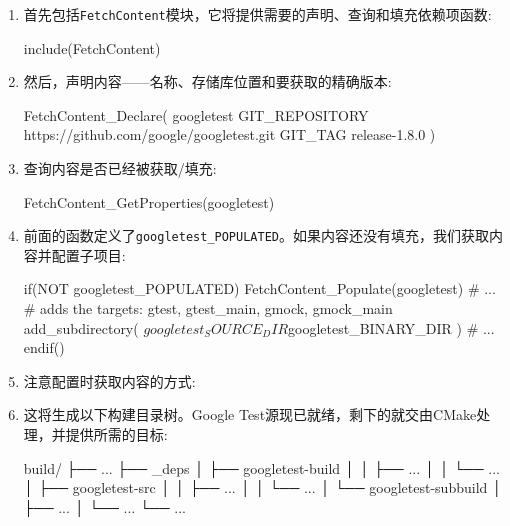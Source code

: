 \begin{enumerate}
\item 首先包括\texttt{FetchContent}模块，它将提供需要的声明、查询和填充依赖项函数:

\begin{codebox}[cmake]
include(FetchContent)
\end{codebox}

\item 然后，声明内容——名称、存储库位置和要获取的精确版本:

\begin{codebox}[cmake]
FetchContent_Declare(
  googletest
  GIT_REPOSITORY https://github.com/google/googletest.git
  GIT_TAG release-1.8.0
)
\end{codebox}

\item 查询内容是否已经被获取/填充:

\begin{codebox}[cmake]
FetchContent_GetProperties(googletest)
\end{codebox}

\item 前面的函数定义了\texttt{googletest\_POPULATED}。如果内容还没有填充，我们获取内容并配置子项目:

\begin{codebox}[cmake]
if(NOT googletest_POPULATED)
  FetchContent_Populate(googletest)
  # ...
  # adds the targets: gtest, gtest_main, gmock, gmock_main
  add_subdirectory(
    ${googletest_SOURCE_DIR}
    ${googletest_BINARY_DIR}
    )
  # ...
endif()
\end{codebox}

\item 注意配置时获取内容的方式:


\item 这将生成以下构建目录树。Google Test源现已就绪，剩下的就交由CMake处理，并提供所需的目标:

\begin{codebox}[shell]
build/
├── ...
├── _deps
│    ├── googletest-build
│    │    ├── ...
│    │    └── ...
│    ├── googletest-src
│    │    ├── ...
│    │    └── ...
│    └── googletest-subbuild
│         ├── ...
│         └── ...
└── ...
\end{codebox}

\end{enumerate}


